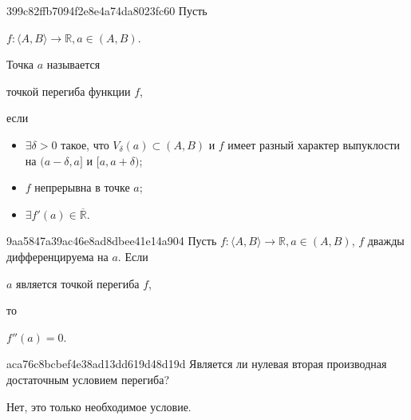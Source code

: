 \begin{note}{399c82ffb7094f2e8e4a74da8023fc60}
    Пусть \begin{icloze}{3}\( f :  \langle A, B \rangle \to \mathbb R, a \in (A, B) \).\end{icloze}
    Точка \( a \) называется \begin{icloze}{2}точкой перегиба функции \( f \),\end{icloze} если
    \begin{icloze}{1}
        \begin{itemize}
            \item \( \exists \delta > 0 \) такое, что \( V_\delta (a) \subset (A, B) \) и \( f \) имеет разный характер выпуклости на \( (a - \delta, a] \) и \( [a, a + \delta) \);
            \item \( f \) непрерывна в точке \( a \);
            \item \( \exists f'(a) \in \overline{\mathbb R} \).
        \end{itemize}
    \end{icloze}
\end{note}

\begin{note}{9aa5847a39ac46e8ad8dbee41e14a904}
    Пусть \( f : \langle A, B \rangle \to \mathbb R, a \in (A, B) \), \( f \) дважды дифференцируема на \( a \).
    Если \begin{icloze}{2}\( a \) является точкой перегиба \( f \),\end{icloze} то \begin{icloze}{1}\( f''(a) = 0 \).\end{icloze}
\end{note}

\begin{note}{aca76c8bcbef4e38ad13dd619d48d19d}
    Является ли нулевая вторая производная достаточным условием перегиба?

    \begin{cloze}{1}
        Нет, это только необходимое условие.
    \end{cloze}
\end{note}

